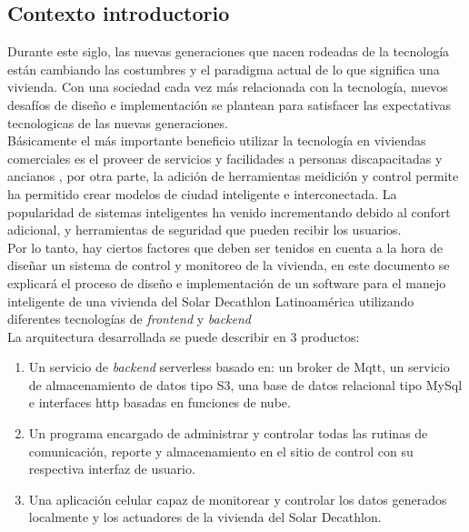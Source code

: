 \subsection{Contexto introductorio}
Durante este siglo, las nuevas generaciones que nacen rodeadas de la tecnología están cambiando las costumbres y el paradigma actual de lo que significa una vivienda. Con una sociedad cada vez más relacionada con la tecnología, nuevos desafíos de diseño e implementación se plantean para satisfacer las expectativas tecnologicas de las nuevas generaciones.
\vspace{0.5cm}\\
Básicamente el más importante beneficio utilizar la tecnología en viviendas comerciales es el proveer de servicios y facilidades a personas discapacitadas y ancianos \cite{GiralSala2016}, por otra parte, la adición de herramientas meidición y control permite ha permitido crear modelos de ciudad inteligente e interconectada. La popularidad de sistemas inteligentes ha venido incrementando debido al confort adicional, y herramientas de seguridad que pueden recibir los usuarios. 
\vspace{0.5cm}\\
Por lo tanto, hay ciertos factores que deben ser tenidos en cuenta a la hora de diseñar un sistema de control y monitoreo de la vivienda, en este documento se explicará el proceso de diseño e implementación de un software para el manejo inteligente de una vivienda del Solar Decathlon Latinoamérica utilizando diferentes tecnologías de \textit{frontend} y \textit{backend}
\vspace{0.5cm}\\
La arquitectura desarrollada se puede describir en 3 productos:
 
\begin{enumerate}
	\item Un servicio de \textit{backend} serverless basado en: un broker de Mqtt, un servicio de almacenamiento de datos tipo S3, una base de datos relacional tipo MySql e interfaces http basadas en funciones de nube.
	\item Un programa encargado de administrar y controlar todas las rutinas de comunicación, reporte y almacenamiento en el sitio de control con su respectiva interfaz de usuario.
	\item Una aplicación celular capaz de monitorear y controlar los datos generados localmente y los actuadores de la vivienda del Solar Decathlon.
\end{enumerate}

